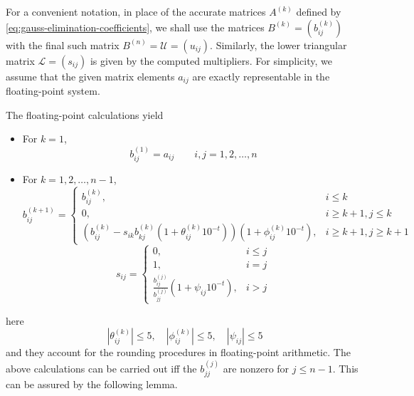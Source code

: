 \documentclass[../main.tex]{subfiles}
\begin{document}
For a convenient notation, in place of the accurate matrices $A^{(k)}$ defined by \eqref{eq:gauss-elimination-coefficients}, we shall use the matrices $B^{(k)} = (b_{ij}^{(k)})$ with the final such matrix $B^{(n)} = \mathcal{U} = (u_{ij})$. Similarly, the lower triangular matrix $\mathcal{L} = (s_{ij})$ is given by the computed multipliers. For simplicity, we assume that the
given matrix elements $a_{ij}$ are exactly representable in the floating-point system.

The floating-point calculations yield
\begin{itemize}
	\item For $k=1$,
	      \begin{equation*}
		      b_{ij}^{(1)} = a_{ij} \qquad i,j = 1, 2, \ldots, n
	      \end{equation*}
	\item For $k=1, 2, \ldots, n-1$,
	      \begin{equation*}
		      b_{ij}^{(k+1)} =
		      \begin{cases}
			      b_{ij}^{(k)},                                                                                      & i \leq k               \\
			      0,                                                                                                 & i \geq k+1, j \leq k   \\
			      (b_{ij}^{(k)} - s_{ik} b_{kj}^{(k)}(1 + \theta_{ij}^{(k)} 10^{-t})) (1 + \phi_{ij}^{(k)} 10^{-t}), & i \geq k+1, j \geq k+1
		      \end{cases}
	      \end{equation*}
	      \begin{equation*}
		      s_{ij} =
		      \begin{cases}
			      0,                                                         & i \leq j \\
			      1,                                                         & i = j    \\
			      \frac{b_{ij}^{(j)}}{b_{jj}^{(j)}} (1 + \psi_{ij} 10^{-t}), & i > j
		      \end{cases}
	      \end{equation*}
\end{itemize}
here
\begin{equation*}
	| \theta_{ij}^{(k)} | \leq 5, \quad | \phi_{ij}^{(k)} | \leq 5, \quad | \psi_{ij} | \leq 5
\end{equation*}
and they account for the rounding procedures in floating-point arithmetic. The above calculations can be carried out iff the $b_{jj}^{(j)}$ are nonzero for $j \leq n-1$. This can be assured by the following lemma.
\end{document}

